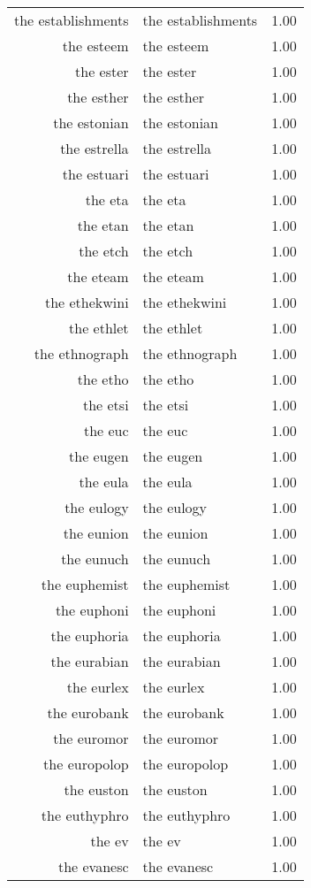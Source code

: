 \begin{table}[ht]
\begin{tabular}{rlr}
  the establishments & the establishments & 1.00 \\ 
  the esteem & the esteem & 1.00 \\ 
  the ester & the ester & 1.00 \\ 
  the esther & the esther & 1.00 \\ 
  the estonian & the estonian & 1.00 \\ 
  the estrella & the estrella & 1.00 \\ 
  the estuari & the estuari & 1.00 \\ 
  the eta & the eta & 1.00 \\ 
  the etan & the etan & 1.00 \\ 
  the etch & the etch & 1.00 \\ 
  the eteam & the eteam & 1.00 \\ 
  the ethekwini & the ethekwini & 1.00 \\ 
  the ethlet & the ethlet & 1.00 \\ 
  the ethnograph & the ethnograph & 1.00 \\ 
  the etho & the etho & 1.00 \\ 
  the etsi & the etsi & 1.00 \\ 
  the euc & the euc & 1.00 \\ 
  the eugen & the eugen & 1.00 \\ 
  the eula & the eula & 1.00 \\ 
  the eulogy & the eulogy & 1.00 \\ 
  the eunion & the eunion & 1.00 \\ 
  the eunuch & the eunuch & 1.00 \\ 
  the euphemist & the euphemist & 1.00 \\ 
  the euphoni & the euphoni & 1.00 \\ 
  the euphoria & the euphoria & 1.00 \\ 
  the eurabian & the eurabian & 1.00 \\ 
  the eurlex & the eurlex & 1.00 \\ 
  the eurobank & the eurobank & 1.00 \\ 
  the euromor & the euromor & 1.00 \\ 
  the europolop & the europolop & 1.00 \\ 
  the euston & the euston & 1.00 \\ 
  the euthyphro & the euthyphro & 1.00 \\ 
  the ev & the ev & 1.00 \\ 
  the evanesc & the evanesc & 1.00 \\ 

\end{tabular}
\end{table}
